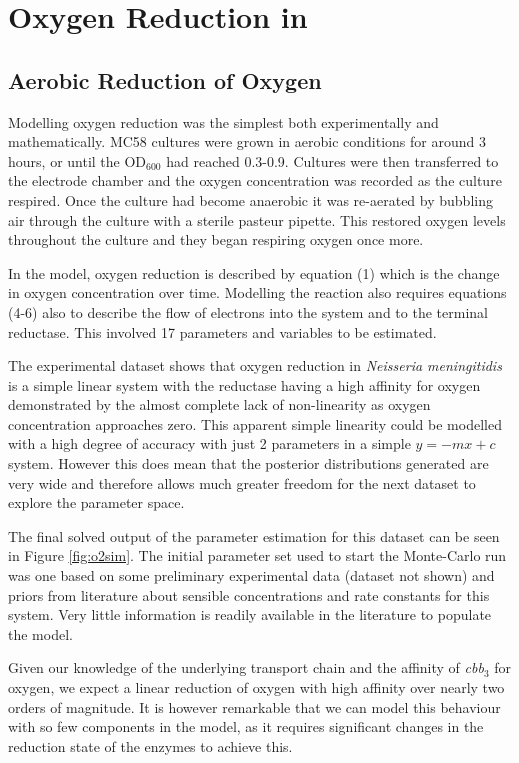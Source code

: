 \chapter{Oxygen Reduction in \Nm{}}
\section{Aerobic Reduction of Oxygen}

Modelling oxygen reduction was the simplest both experimentally and mathematically. MC58 cultures were grown in aerobic conditions for around 3 hours, or until the $\mathrm{OD}_{600}$ had reached 0.3-0.9. Cultures were then transferred to the electrode chamber and the oxygen concentration was recorded as the culture respired. Once the culture had become anaerobic it was re-aerated by bubbling air through the culture with a sterile pasteur pipette. This  restored oxygen levels throughout the culture and they began respiring oxygen once more.

In the model, oxygen reduction is described by equation (1) which is the change in oxygen concentration over time. Modelling the reaction also requires equations (4-6) also to describe the flow of electrons into the system and to the terminal reductase. This involved 17 parameters and variables to be estimated.

The experimental dataset shows that oxygen reduction in \textit{Neisseria meningitidis} is a simple linear system with the reductase having a high affinity for oxygen demonstrated by the almost complete lack of non-linearity as oxygen concentration approaches zero. This apparent simple linearity could be modelled with a high degree of accuracy with just 2 parameters in a simple $y=-mx+c$ system. However this does mean that the posterior distributions generated are very wide and therefore allows much greater freedom for the next dataset to explore the parameter space.

The final solved output of the parameter estimation for this dataset can be seen in Figure \ref{fig:o2sim}. The initial parameter set used to start the Monte-Carlo run was one based on some preliminary experimental data (dataset not shown) and priors from literature about sensible concentrations and rate constants for this system. Very little information is readily available in the literature to populate the model.

Given our knowledge of the underlying transport chain and the affinity of \textit{cbb$_{\textrm{3}}$} for oxygen, we expect a linear reduction of oxygen with high affinity over nearly two orders of magnitude. It is however remarkable that we can model this behaviour with so few components in the model, as it requires significant changes in the reduction state of the enzymes to achieve this.

